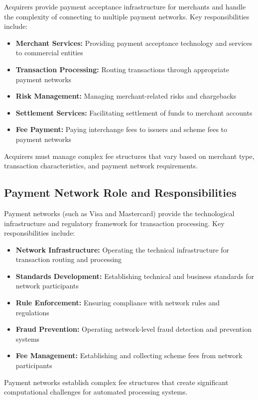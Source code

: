 Acquirers provide payment acceptance infrastructure for merchants and handle the complexity of connecting to multiple payment networks. Key responsibilities include:

\begin{itemize}
    \item \textbf{Merchant Services:} Providing payment acceptance technology and services to commercial entities
    \item \textbf{Transaction Processing:} Routing transactions through appropriate payment networks
    \item \textbf{Risk Management:} Managing merchant-related risks and chargebacks
    \item \textbf{Settlement Services:} Facilitating settlement of funds to merchant accounts
    \item \textbf{Fee Payment:} Paying interchange fees to issuers and scheme fees to payment networks
\end{itemize}

Acquirers must manage complex fee structures that vary based on merchant type, transaction characteristics, and payment network requirements.

\subsection{Payment Network Role and Responsibilities}

Payment networks (such as Visa and Mastercard) provide the technological infrastructure and regulatory framework for transaction processing. Key responsibilities include:

\begin{itemize}
    \item \textbf{Network Infrastructure:} Operating the technical infrastructure for transaction routing and processing
    \item \textbf{Standards Development:} Establishing technical and business standards for network participants
    \item \textbf{Rule Enforcement:} Ensuring compliance with network rules and regulations
    \item \textbf{Fraud Prevention:} Operating network-level fraud detection and prevention systems
    \item \textbf{Fee Management:} Establishing and collecting scheme fees from network participants
\end{itemize}

Payment networks establish complex fee structures that create significant computational challenges for automated processing systems.

